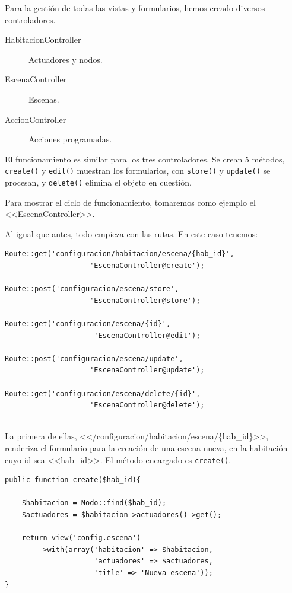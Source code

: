     
    
  Para la gestión de todas las vistas y formularios, hemos creado diversos controladores.
    
    \begin{description}
        \item[HabitacionController] Actuadores y nodos.
        \item[EscenaController] Escenas.
        \item[AccionController] Acciones programadas.
    \end{description}
    
    El funcionamiento es similar para los tres controladores. Se crean 5 métodos, \lstinline|create()| y \lstinline|edit()| muestran los formularios, con \lstinline|store()| y \lstinline|update()| se procesan, y \lstinline|delete()| elimina el objeto en cuestión.
    
    Para mostrar el ciclo de funcionamiento, tomaremos como ejemplo el <<EscenaController>>.
    
    Al igual que antes, todo empieza con las rutas. En este caso tenemos:
    
    \begin{lstlisting}
Route::get('configuracion/habitacion/escena/{hab_id}', 
                    'EscenaController@create');

Route::post('configuracion/escena/store', 
                    'EscenaController@store');

Route::get('configuracion/escena/{id}',
                     'EscenaController@edit');

Route::post('configuracion/escena/update', 
                    'EscenaController@update');

Route::get('configuracion/escena/delete/{id}', 
                    'EscenaController@delete');
    
    \end{lstlisting}
    
    La primera de ellas, <</configuracion/habitacion/escena/\{hab\_id\}>>, renderiza el formulario para la creación de una escena nueva, en la habitación cuyo id sea <<hab\_id>>. El método encargado es \lstinline|create()|.
    
\begin{lstlisting}
public function create($hab_id){

    $habitacion = Nodo::find($hab_id);
    $actuadores = $habitacion->actuadores()->get();
    
    return view('config.escena')
        ->with(array('habitacion' => $habitacion,
                     'actuadores' => $actuadores,
                     'title' => 'Nueva escena'));
}
\end{lstlisting}
   

